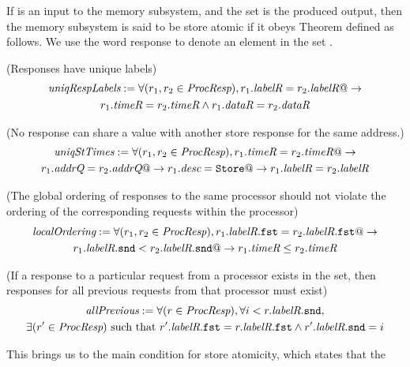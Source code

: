 If \reqFn{} is an input to the memory subsystem, and the set \Response{} is the
produced output, then the memory subsystem is said to be store atomic if it
obeys Theorem  defined as follows. We use the word
response to denote an element in the set \Response{}.
%
\begin{defn} (Responses have unique labels)
\small
\begin{multline*}
\textit{uniqRespLabels} := \forall (r_1, r_2 \in \textit{ProcResp}),
r_1.\textit{labelR} = r_2.\textit{labelR} @-> \\ r_1.\textit{timeR} = r_2.\textit{timeR} \wedge
r_1.\textit{dataR} = r_2.\textit{dataR}
\end{multline*}
\label{uniqRespLabels}
\end{defn}
%
\begin{defn} (No response can share a \timeR{} value with another store
response for the same address.)
\small
\begin{multline*}
\textit{uniqStTimes} := 
\forall (r_1, r_2 \in \textit{ProcResp}),
r_1.\textit{timeR} = r_2.\textit{timeR} @-> \\
r_1.\textit{addrQ} = r_2.\textit{addrQ} @->
r_1.\textit{desc} = \texttt{Store} @->
r_1.\textit{labelR} = r_2.\textit{labelR}
\end{multline*}
\label{uniqStTimes}
\end{defn}
%
\begin{defn} (The global ordering of responses to the same processor should not
violate the ordering of the corresponding requests within the processor)
\small
\begin{multline*}
\textit{localOrdering} :=
\forall (r_1, r_2 \in \textit{ProcResp}), r_1.\textit{labelR}.\texttt{fst} = r_2.\textit{labelR}.\texttt{fst} @->\\
r_1.\textit{labelR}.\texttt{snd} < r_2.\textit{labelR}.\texttt{snd} @-> r_1.\textit{timeR} \le r_2.\textit{timeR}
\end{multline*}
\label{localOrdering}
\end{defn}
%
\begin{defn} (If a response to a particular request from a processor exists in the \Response{} set,
then responses for all previous requests from that processor must exist)
\small
\begin{multline*}
\textit{allPrevious} :=
\forall (r \in \textit{ProcResp}), \forall i < r.\textit{labelR}.\texttt{snd}, \\
\exists (r' \in \textit{ProcResp}) \text{ such that } r'.\textit{labelR}.\texttt{fst} = r.\textit{labelR}.\texttt{fst} \wedge r'.\textit{labelR}.\texttt{snd} = i
\end{multline*}
\label{allPrevious}
\end{defn}
%
This brings us to the main condition for store atomicity, which states that the

